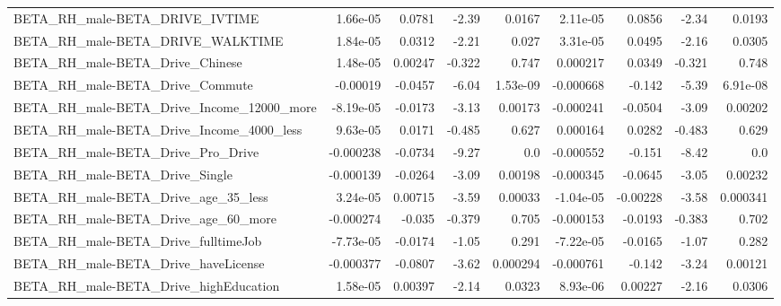\begin{tabular}{lrrrrrrrr}
BETA\_RH\_male-BETA\_DRIVE\_IVTIME                     &    1.66e-05 &       0.0781 &     -2.39 &   0.0167 &   2.11e-05 &      0.0856 &        -2.34 &        0.0193 \\
BETA\_RH\_male-BETA\_DRIVE\_WALKTIME                   &    1.84e-05 &       0.0312 &     -2.21 &    0.027 &   3.31e-05 &      0.0495 &        -2.16 &        0.0305 \\
BETA\_RH\_male-BETA\_Drive\_Chinese                    &    1.48e-05 &      0.00247 &    -0.322 &    0.747 &   0.000217 &      0.0349 &       -0.321 &         0.748 \\
BETA\_RH\_male-BETA\_Drive\_Commute                    &    -0.00019 &      -0.0457 &     -6.04 & 1.53e-09 &  -0.000668 &      -0.142 &        -5.39 &      6.91e-08 \\
BETA\_RH\_male-BETA\_Drive\_Income\_12000\_more          &   -8.19e-05 &      -0.0173 &     -3.13 &  0.00173 &  -0.000241 &     -0.0504 &        -3.09 &       0.00202 \\
BETA\_RH\_male-BETA\_Drive\_Income\_4000\_less           &    9.63e-05 &       0.0171 &    -0.485 &    0.627 &   0.000164 &      0.0282 &       -0.483 &         0.629 \\
BETA\_RH\_male-BETA\_Drive\_Pro\_Drive                  &   -0.000238 &      -0.0734 &     -9.27 &      0.0 &  -0.000552 &      -0.151 &        -8.42 &           0.0 \\
BETA\_RH\_male-BETA\_Drive\_Single                     &   -0.000139 &      -0.0264 &     -3.09 &  0.00198 &  -0.000345 &     -0.0645 &        -3.05 &       0.00232 \\
BETA\_RH\_male-BETA\_Drive\_age\_35\_less                &    3.24e-05 &      0.00715 &     -3.59 &  0.00033 &  -1.04e-05 &    -0.00228 &        -3.58 &      0.000341 \\
BETA\_RH\_male-BETA\_Drive\_age\_60\_more                &   -0.000274 &       -0.035 &    -0.379 &    0.705 &  -0.000153 &     -0.0193 &       -0.383 &         0.702 \\
BETA\_RH\_male-BETA\_Drive\_fulltimeJob                &   -7.73e-05 &      -0.0174 &     -1.05 &    0.291 &  -7.22e-05 &     -0.0165 &        -1.07 &         0.282 \\
BETA\_RH\_male-BETA\_Drive\_haveLicense                &   -0.000377 &      -0.0807 &     -3.62 & 0.000294 &  -0.000761 &      -0.142 &        -3.24 &       0.00121 \\
BETA\_RH\_male-BETA\_Drive\_highEducation              &    1.58e-05 &      0.00397 &     -2.14 &   0.0323 &   8.93e-06 &     0.00227 &        -2.16 &        0.0306 \\

\end{tabular}

